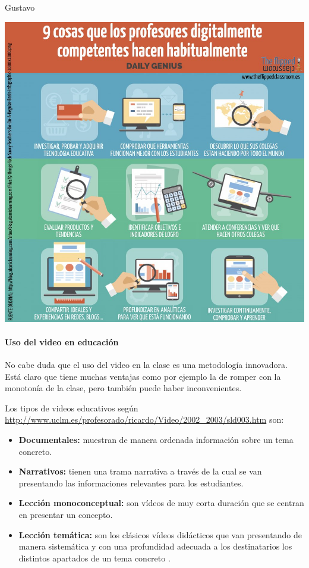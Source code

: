 \begin{opin}{\guscolor}{Gustavo}
\begin{minipage}[h]{1\linewidth}
	\centering
	\includegraphics[width=0.8\linewidth]{img/9cosasdegus.jpg}
\end{minipage}

 
\paragraph{Uso del video en educación}
No cabe duda que el uso del video en la clase es una metodología innovadora. Está claro que tiene muchas ventajas como por ejemplo la de romper con la monotonía de la clase, pero también puede haber inconvenientes.

Los tipos de videos educativos según \url{http://www.uclm.es/profesorado/ricardo/Video/2002_2003/sld003.htm} son:

\begin{itemize}
\item \textbf{Documentales:} muestran de manera ordenada información sobre un tema concreto. 

\item \textbf{Narrativos:} tienen una trama narrativa a través de la cual se van presentando las informaciones relevantes para los estudiantes.  

\item \textbf{Lección monoconceptual:} son vídeos de muy corta duración que se centran en presentar un concepto.  

\item \textbf{Lección temática:} son los clásicos vídeos didácticos que van presentando de manera sistemática y con una profundidad adecuada a los destinatarios los distintos apartados de un tema concreto .  


\end{itemize}
\end{opin}
